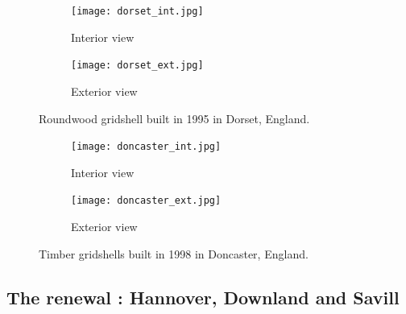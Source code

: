 \begin{figure}[t]
	\begin{subfigure}[b]{\TwoMediaWidth}
		\texttt{[image: dorset\_int.jpg]}
		\caption{Interior view}
		\label{fig:dorset_a}
	\end{subfigure}%
	\hspace{\MediaGutterWidth}%
	\begin{subfigure}[b]{\TwoMediaWidth}
		\texttt{[image: dorset\_ext.jpg]}
		\caption{Exterior view}
		\label{fig:dorset_b}
	\end{subfigure}
	\caption[Roundwood gridshell built in 1995 in Dorset, England]{Roundwood gridshell built in 1995 in Dorset, England.}
	\label{fig:dorset}
\end{figure}

\begin{figure}[t]
	\begin{subfigure}[b]{\TwoMediaWidth}
		\texttt{[image: doncaster\_int.jpg]}
		\caption{Interior view}
		\label{fig:doncaster_a}
	\end{subfigure}%
	\hspace{\MediaGutterWidth}%
	\begin{subfigure}[b]{\TwoMediaWidth}
		\texttt{[image: doncaster\_ext.jpg]}
		\caption{Exterior view}
		\label{fig:doncaster_b}
	\end{subfigure}
	\caption[Timber gridshells built in 1998 in Doncaster, England]{Timber gridshells built in 1998 in Doncaster, England.}
	\label{fig:doncaster}
\end{figure}


\subsection{The renewal : Hannover, Downland and Savill}
\label{sec=renewal}

